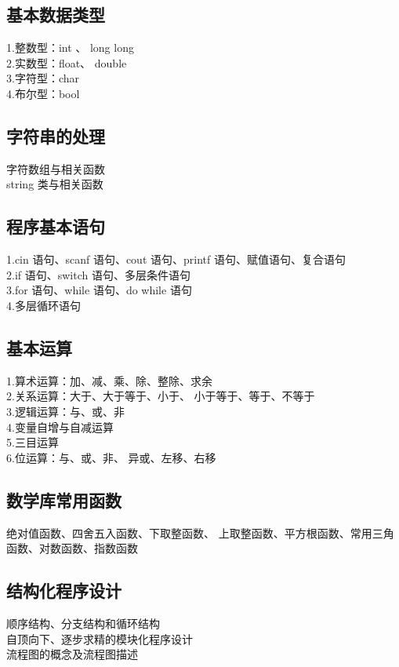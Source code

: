 \documentclass[12pt,twiside,a4paper]{ctexbook}
\numberwithin{chapter}{part}
\begin{document}
\subsection{基本数据类型}
1.整数型：int 、 long long\\
2.实数型：float、 double\\
3.字符型：char\\
4.布尔型：bool

\subsection{字符串的处理}
字符数组与相关函数\\
string 类与相关函数

\subsection{程序基本语句}
1.cin 语句、scanf 语句、cout 语句、printf
语句、赋值语句、复合语句\\
2.if 语句、switch 语句、多层条件语句\\
3.for 语句、while 语句、do while 语句\\
4.多层循环语句

\subsection{基本运算}
1.算术运算：加、减、乘、除、整除、求余\\
2.关系运算：大于、大于等于、小于、
小于等于、等于、不等于\\
3.逻辑运算：与、或、非\\
4.变量自增与自减运算\\
5.三目运算\\
6.位运算：与、或、非、
异或、左移、右移

\subsection{数学库常用函数}
绝对值函数、四舍五入函数、下取整函数、
上取整函数、平方根函数、常用三角
函数、对数函数、指数函数

\subsection{结构化程序设计}
顺序结构、分支结构和循环结构\\
自顶向下、逐步求精的模块化程序设计\\
流程图的概念及流程图描述
\end{document}
